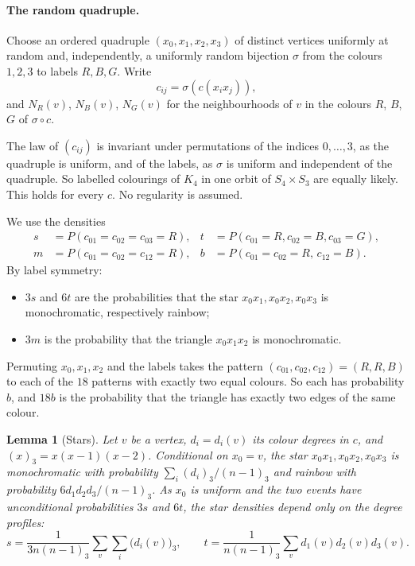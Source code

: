\documentclass[11pt]{article}
\theoremstyle{spacedplain}
\newtheorem{lemma}[theorem]{Lemma}
\theoremstyle{spaceddef}
\theoremstyle{spacedremark}
\begin{document}
\paragraph{The random quadruple.}
Choose an ordered quadruple $(x_0,x_1,x_2,x_3)$ of distinct vertices uniformly at random and, independently, a uniformly random bijection $\sigma$ from the colours $1,2,3$ to labels $R,B,G$.
Write
\[
c_{ij}=\sigma(c(x_ix_j)),
\]
and $N_R(v)$, $N_B(v)$, $N_G(v)$ for the neighbourhoods of $v$ in the colours $R$, $B$, $G$ of $\sigma\circ c$.

The law of $(c_{ij})$ is invariant under permutations of the indices $0,\dots,3$, as the quadruple is uniform, and of the labels, as $\sigma$ is uniform and independent of the quadruple.
So labelled colourings of $K_4$ in one orbit of $S_4\times S_3$ are equally likely.
This holds for every $c$.
No regularity is assumed.

We use the densities
\begin{align*}
s&=P(c_{01}{=}c_{02}{=}c_{03}{=}R), & t&=P(c_{01}{=}R,c_{02}{=}B,c_{03}{=}G),\\
m&=P(c_{01}{=}c_{02}{=}c_{12}{=}R), & b&=P(c_{01}{=}c_{02}{=}R,\,c_{12}{=}B).
\end{align*}
By label symmetry:
\begin{itemize}
\item $3s$ and $6t$ are the probabilities that the star $x_0x_1,x_0x_2,x_0x_3$ is monochromatic, respectively rainbow;
\item $3m$ is the probability that the triangle $x_0x_1x_2$ is monochromatic.
\end{itemize}
Permuting $x_0,x_1,x_2$ and the labels takes the pattern $(c_{01},c_{02},c_{12})=(R,R,B)$ to each of the $18$ patterns with exactly two equal colours.
So each has probability $b$, and $18b$ is the probability that the triangle has exactly two edges of the same colour.

\begin{lemma}[Stars]\label{lem:stars}
Let $v$ be a vertex, $d_i=d_i(v)$ its colour degrees in $c$, and $(x)_3=x(x-1)(x-2)$.
Conditional on $x_0=v$, the star $x_0x_1,x_0x_2,x_0x_3$ is monochromatic with probability $\sum_i(d_i)_3/(n-1)_3$ and rainbow with probability $6d_1d_2d_3/(n-1)_3$.
As $x_0$ is uniform and the two events have unconditional probabilities $3s$ and $6t$, the star densities depend only on the degree profiles:
\[
s=\frac{1}{3n(n-1)_3}\sum_v\sum_i\big(d_i(v)\big)_3,\qquad t=\frac{1}{n(n-1)_3}\sum_v d_1(v)d_2(v)d_3(v).
\]
\end{lemma}
\end{document}

